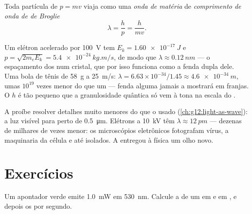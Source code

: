 \begin{definition}\label{def:g12:quantum-world:debroglie}
Toda partícula de  $p = mv$ viaja como uma \emph{onda de
matéria} de \emph{comprimento de onda de de
Broglie}
\[
\lambda = \frac{h}{p} = \frac{h}{mv}.
\]
\end{definition}
\admitted

\begin{example}\label{ex:g12:quantum-world:never}
Um elétron acelerado por \qty{100}{V} tem $E_k = \qty{1.60e-17}{J}$ e
$p = \sqrt{2m_e E_k} = \qty{5.4e-24}{kg.m/s}$, de modo que
$\lambda \approx \qty{0.12}{nm}$ --- o espaçamento dos  num cristal, que por isso
funciona como a fenda dupla dele. Uma bola de tênis de \qty{58}{g} a \qty{25}{m/s}:
$\lambda = 6.63\times10^{-34}/1.45 \approx \qty{4.6e-34}{m}$, umas $10^{19}$ vezes menor
do que um  --- fenda alguma jamais a mostrará em franjas. O $h$ é tão pequeno que
a granulosidade quântica só vem à tona na escala do .
\end{example}

\begin{example}\label{ex:g12:quantum-world:microscope}
A  proíbe resolver detalhes muito menores do que o  usado
(\cref{ch:g12:light-as-wave}): a luz visível para perto de \qty{0.5}{\micro m}. Elétrons
a \qty{10}{kV} têm $\lambda \approx \qty{12}{pm}$ --- dezenas de milhares de vezes menor:
os microscópios eletrônicos fotografam vírus, a maquinaria da célula e até 
isolados. A  entregou à física um olho novo.
\end{example}

\section{Exercícios}

\begin{exercise}[$\star$]\label{exo:g12:quantum-world:1}
Um apontador  verde emite \qty{1.0}{mW} em \qty{530}{nm}. Calcule a  de um
 em  e em , e depois os  por segundo.
\end{exercise}

